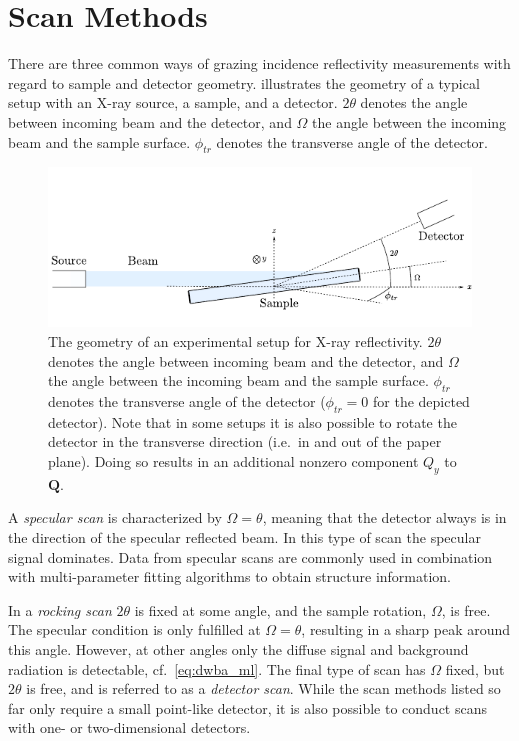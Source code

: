 \documentclass[10pt,twoside, b5paper,pdftex]{report}
\begin{document}
\section{Scan Methods}
There are three common ways of grazing incidence reflectivity measurements with regard to sample and detector geometry.  illustrates the geometry of a typical setup with an X-ray source, a sample, and a detector. $2\theta$ denotes the angle between incoming beam and the detector, and $\Omega$  the angle between the incoming beam and the sample surface. $\phi_{tr}$ denotes the transverse angle of the detector.
\begin{figure}[htbp]
	\begin{center}
		\includegraphics[width=1.0\textwidth]{figures/exp.pdf}		
	\end{center}
	\caption{The geometry of an experimental setup for X-ray reflectivity. $2\theta$ denotes the angle between incoming beam and the detector, and $\Omega$ the angle between the incoming beam and the sample surface. $\phi_{tr}$ denotes the transverse angle of the detector ($\phi_{tr}= 0$ for the depicted detector). Note that in some setups it is also possible to rotate the detector in the transverse direction (i.e.~in and out of the paper plane). Doing so results in  an additional nonzero component $Q_y$ to $\mathbf{Q}$. \label{fig:exp}}
\end{figure}

A {\it specular scan} is characterized by $\Omega = \theta$, meaning that the detector always is in the  direction of the specular reflected beam. In this type of scan the specular signal dominates. Data from specular scans are commonly used in combination with multi-parameter fitting algorithms to obtain structure information. 

In a {\it rocking scan} $2\theta$ is fixed at some angle, and the sample rotation, $\Omega$, is free. The specular condition is only fulfilled at $\Omega = \theta$, resulting in a sharp peak around this angle. However, at other angles only the diffuse signal and background radiation is detectable, cf.~\cref{eq:dwba_ml}. The final type of scan has  $\Omega$ fixed, but $2\theta$ is free, and is referred to as a {\it detector scan}. While the scan methods listed so far only require a small point-like detector, it is also possible to conduct scans with one- or two-dimensional detectors.
\end{document}
